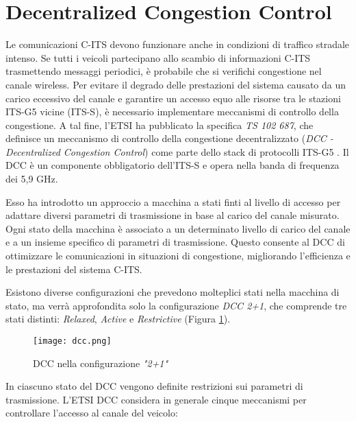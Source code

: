 \section[ETSI DCC]{Decentralized Congestion Control}
\label{dcc}
Le comunicazioni C-ITS devono funzionare anche in condizioni di traffico stradale intenso. Se tutti i veicoli partecipano allo scambio di informazioni C-ITS trasmettendo messaggi periodici, è probabile che si verifichi congestione nel canale wireless. Per evitare il degrado delle prestazioni del sistema causato da un carico eccessivo del canale e garantire un accesso equo alle risorse tra le stazioni ITS-G5 vicine (ITS-S), è necessario implementare meccanismi di controllo della congestione. A tal fine, l'ETSI ha pubblicato la specifica \textit{TS 102 687}, che definisce un meccanismo di controllo della congestione decentralizzato (\textit{DCC - Decentralized Congestion Control}) come parte dello stack di protocolli ITS-G5 \cite{8535090}. Il DCC è un componente obbligatorio dell'ITS-S e opera nella banda di frequenza dei 5,9 GHz.

Esso ha introdotto un approccio a macchina a stati finti al livello di accesso per adattare diversi parametri di trasmissione in base al carico del canale misurato. Ogni stato della macchina è associato a un determinato livello di carico del canale e a un insieme specifico di parametri di trasmissione. Questo consente al DCC di ottimizzare le comunicazioni in situazioni di congestione, migliorando l'efficienza e le prestazioni del sistema C-ITS.

Esistono diverse configurazioni che prevedono molteplici stati nella macchina di stato, ma verrà approfondita solo la configurazione \textit{DCC 2+1}, che comprende tre stati distinti: \textit{Relaxed}, \textit{Active} e \textit{Restrictive} (Figura \ref{fig:dcc}).

\begin{figure}[h!]
    \centering
    \texttt{[image: dcc.png]}
    \caption{DCC nella configurazione \textit{"2+1"}}
    \label{fig:dcc}
\end{figure}

In ciascuno stato del DCC vengono definite restrizioni sui parametri di trasmissione. L'ETSI DCC considera in generale cinque meccanismi per controllare l'accesso al canale del veicolo:

